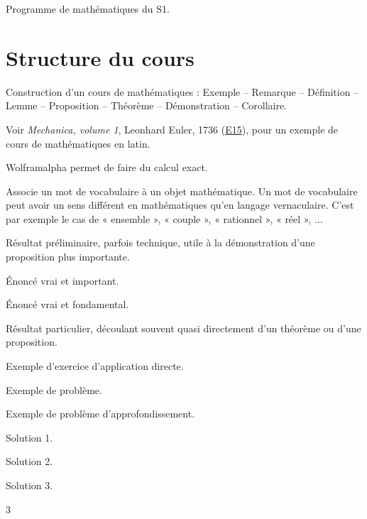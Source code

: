 Programme de mathématiques du S1.

\section*{Structure du cours}

Construction d'un cours de mathématiques : Exemple -- Remarque -- Définition -- Lemme -- Proposition -- Théorème -- Démonstration -- Corollaire.

Voir \emph{Mechanica, volume 1}, Leonhard Euler, 1736 (\href{https://scholarlycommons.pacific.edu/euler-works/15/}{E15}), pour un exemple de cours de mathématiques en latin.

Wolframalpha permet de faire du calcul exact.

\begin{definition*}
Associe un mot de vocabulaire à un objet mathématique.
Un mot de vocabulaire peut avoir un sens différent en mathématiques qu'en langage vernaculaire.
C'est par exemple le cas de « ensemble », « couple », « rationnel », « réel », ...
\end{definition*}

\begin{lemme*}
	Résultat préliminaire, parfois technique, utile à la démonstration d'une proposition plus importante.
\end{lemme*}

\begin{proposition*}
	Énoncé vrai et important.
\end{proposition*}

\begin{theorem*}
	Énoncé vrai et fondamental.
\end{theorem*}

\begin{corollaire*}
	Résultat particulier, découlant souvent quasi directement d'un théorème ou d'une proposition.
\end{corollaire*}

\begin{Exercise}[label=1]%
	Exemple d'exercice d'application directe.
\end{Exercise}
\begin{Exercise}[difficulty=1, label=2]%
	Exemple de problème.
\end{Exercise}
\begin{Exercise}[difficulty=2, label=3]%
	Exemple de problème d'approfondissement.
\end{Exercise}
\shipoutExercise
\begin{Answer}[ref=1]
	Solution 1.
\end{Answer}
\begin{Answer}[ref=2]
	Solution 2.
\end{Answer}
\begin{Answer}[ref=3]
	Solution 3.
\end{Answer}
\begin{multicols}{3}
\shipoutAnswer
\end{multicols}
